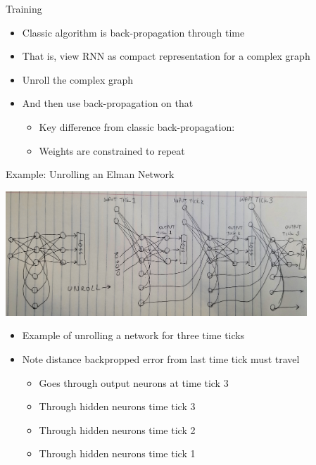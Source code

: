 \documentclass[aspectratio=169]{beamer}
\begin{document}
\begin{frame}{Training}

\begin{itemize}
        \item Classic algorithm is back-propagation through time
	\item That is, view RNN as compact representation for a complex graph
	\item Unroll the complex graph
	\item And then use back-propagation on that
	\begin{itemize}
		\item Key difference from classic back-propagation:
		\item Weights are constrained to repeat
	\end{itemize}
\end{itemize}
\end{frame}
\begin{frame}{Example: Unrolling an Elman Network}

\includegraphics[width=0.85\textwidth]{lectRNN/Unrolled.jpg}

\begin{itemize}
	\item Example of unrolling a network for three time ticks
	\item Note distance backpropped error from last time tick must travel
	\begin{itemize}
		\item Goes through output neurons at time tick 3
		\item Through hidden neurons time tick 3
		\item Through hidden neurons time tick 2
		\item Through hidden neurons time tick 1
	\end{itemize}
\end{itemize}
\end{frame}
\end{document}
